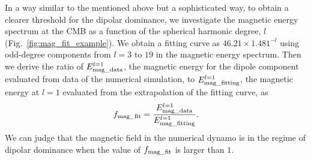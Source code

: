 {\color{red}
In a way similar to the mentioned above but a sophisticated way, to obtain a clearer threshold for the dipolar dominance, we investigate the magnetic energy spectrum at the CMB as a function of the spherical harmonic degree, $l$ (Fig.~\ref{fig:mag_fit_example}).
We obtain a fitting curve as $46.21 \times 1.481^{-l}$ using odd-degree components from $l = 3$ to $19$ in the magnetic energy spectrum.
Then we derive the ratio of $E_{\rm mag\_data}^{l=1}$, the magnetic energy for the dipole component evaluated from data of the numerical simulation, to $E_{\rm mag\_fitting}^{l=1}$, the magnetic energy at $l=1$ evaluated from the extrapolation of the fitting curve, as 
%
\begin{equation}
f_{\rm mag\_fit} = \frac{E_{\rm mag\_data}^{l=1} }{E_{\rm mag\_fitting}^{l=1}} .
\label{eq:def_f_mag_fit}
\end{equation}
%
We can judge that the magnetic field in the numerical dynamo is in the regime of dipolar dominance when the value of $f_{\rm mag\_fit}$ is larger than $1$.
}

